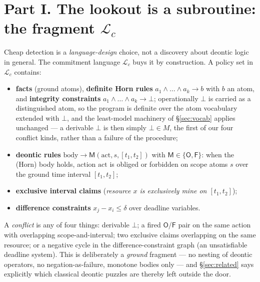 \documentclass[11pt,a4paper]{article}
\newcommand{\Ob}{\mathsf{O}}
\newcommand{\Fb}{\mathsf{F}}
\begin{document}
\section{Part I. The lookout is a subroutine: the fragment $\mathcal{L}_c$}\label{sec:lang}\label{sec:thm-detect}
Cheap detection is a \emph{language-design} choice, not a discovery about deontic logic in general. The commitment language
$\mathcal{L}_c$ buys it by construction. A policy set in $\mathcal{L}_c$ contains: \begin{itemize}
\item \textbf{facts} (ground atoms), \textbf{definite Horn rules} $a_1\wedge\dots\wedge a_k \to b$ with $b$ an atom, and
\textbf{integrity constraints} $a_1\wedge\dots\wedge a_k \to \bot$; operationally $\bot$ is carried as a distinguished atom, so
the program is definite over the atom vocabulary extended with $\bot$, and the least-model machinery of \S\ref{sec:vocab}
applies unchanged ---
a derivable $\bot$ is then simply $\bot \in M$, the first of our four conflict kinds, rather than a failure of the procedure;
\item \textbf{deontic rules} $\mathrm{body} \to \mathsf{M}(\mathrm{act}, s, [t_1,t_2])$ with $\mathsf{M}\in\{\Ob,\Fb\}$: when the
(Horn) body holds, action $\mathrm{act}$ is obliged or forbidden on scope atoms $s$ over the ground time interval $[t_1,t_2]$;
\item \textbf{exclusive interval claims} (\emph{resource $x$ is exclusively mine on $[t_1,t_2]$});
\item \textbf{difference constraints} $x_j - x_i \le \delta$ over deadline variables.
\end{itemize}
A \emph{conflict} is any of four things: derivable $\bot$; a fired $\Ob$/$\Fb$ pair on the same action with overlapping
scope-and-interval; two exclusive claims overlapping on the same resource; or a negative cycle in the difference-constraint graph
(an unsatisfiable deadline system). This is deliberately a \emph{ground} fragment --- no nesting of deontic operators, no
negation-as-failure, monotone bodies only --- and \S\ref{sec:related} says explicitly which classical deontic puzzles are thereby
left outside the door.
\end{document}
